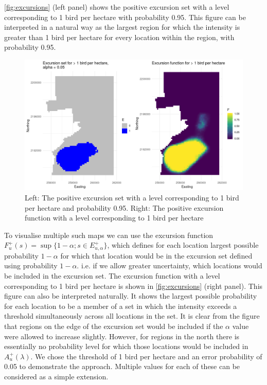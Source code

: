 \documentclass[preprint,12pt]{elsarticle}
\begin{document}
\autoref{fig:excursions} (left panel) shows the positive excursion set with a level corresponding to 1 bird per hectare with probability 0.95.  This figure can be interpreted in a natural way as the largest region for which the intensity is greater than 1 bird per hectare for every location within the region, with probability 0.95.
\begin{figure}
	\includegraphics[scale=0.5]{figures/excursions.png}
	\caption{Left:  The positive excursion set with a level corresponding to 1 bird per hectare and probability 0.95.  Right: The positive excursion function with a level corresponding to 1 bird per hectare}
	\label{fig:excursions}
\end{figure}
To visualise multiple such maps we can use the excursion function $F_u^{+}(s) = \sup \{1 - \alpha ; s \in E_{u,\alpha}^+ \}$, which defines for each location largest possible probability $1 -\alpha$ for which that location would be in the excursion set defined using probability $1 - \alpha$.  i.e.  if we allow greater uncertainty, which locations would be included in the excursion set.  The excursion function with a level corresponding to 1 bird per hectare is shown in \autoref{fig:excursions} (right panel).  This figure can also be interpreted naturally.  It shows the largest possible probability for each location to be a member of a set in which the intensity exceeds a threshold simultaneously across all locations in the set. It is clear from the figure that regions on the edge of the excursion set would be included if the $\alpha$ value were allowed to increase slightly.  However, for regions in the north there is essentially no probability level for which those locations would be included in $A_u^{+}(\lambda)$.  
We chose the threshold of 1 bird per hectare and an error probability of 0.05 to demonstrate the approach.  Multiple values for each of these can be considered as a simple extension.
\end{document}
